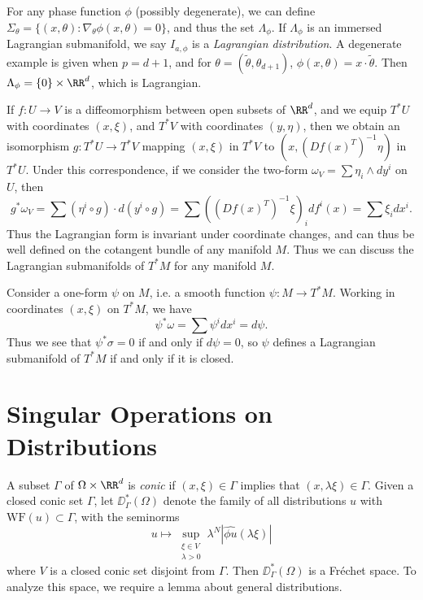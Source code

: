 For any phase function $\phi$ (possibly degenerate), we can define $\Sigma_\theta = \{ (x,\theta): \nabla_\theta \phi(x,\theta) = 0 \}$, and thus the set $\Lambda_\phi$. If $\Lambda_\phi$ is an immersed Lagrangian submanifold, we say $I_{a,\phi}$ is a \emph{Lagrangian distribution}. A degenerate example is given when $p = d+1$, and for $\theta = (\tilde{\theta}, \theta_{d+1})$, $\phi(x,\theta) = x \cdot \tilde{\theta}$. Then $\Lambda_\phi = \{ 0 \} \times \RR^d$, which is Lagrangian.

If $f: U \to V$ is a diffeomorphism between open subsets of $\RR^d$, and we equip $T^* U$ with coordinates $(x,\xi)$, and $T^* V$ with coordinates $(y,\eta)$, then we obtain an isomorphism $g: T^* U \to T^* V$ mapping $(x,\xi)$ in $T^* V$ to $(x, (Df(x)^T)^{-1} \eta)$ in $T^* U$. Under this correspondence, if we consider the two-form $\omega_V = \sum \eta_i \wedge dy^i$ on $U$, then
%
\[ g^* \omega_V = \sum (\eta^i \circ g) \cdot d(y^i \circ g) = \sum ((Df(x)^T)^{-1} \xi)_i df^i(x) = \sum \xi_i dx^i. \]
%
Thus the Lagrangian form is invariant under coordinate changes, and can thus be well defined on the cotangent bundle of any manifold $M$. Thus we can discuss the Lagrangian submanifolds of $T^* M$ for any manifold $M$.

\begin{example}
    Consider a one-form $\psi$ on $M$, i.e. a smooth function $\psi: M \to T^* M$. Working in coordinates $(x,\xi)$ on $T^* M$, we have
    \[ \psi^* \omega = \sum \psi^i dx^i = d\psi. \]
    Thus we see that $\psi^* \sigma = 0$ if and only if $d\psi = 0$, so $\psi$ defines a Lagrangian submanifold of $T^* M$ if and only if it is closed.
\end{example}

\section{Singular Operations on Distributions}

A subset $\Gamma$ of $\Omega \times \RR^d$ is \emph{conic} if $(x,\xi) \in \Gamma$ implies that $(x,\lambda \xi) \in \Gamma$. Given a closed conic set $\Gamma$, let $\DD^*_\Gamma(\Omega)$ denote the family of all distributions $u$ with $\text{WF}(u) \subset \Gamma$, with the seminorms
%
\[ u \mapsto \sup_{\substack{\xi \in V\\\lambda > 0}} \lambda^N |\widehat{\phi u}(\lambda \xi)| \]
%
where $V$ is a closed conic set disjoint from $\Gamma$. Then $\DD^*_\Gamma(\Omega)$ is a Fr\'{e}chet space. To analyze this space, we require a lemma about general distributions.

